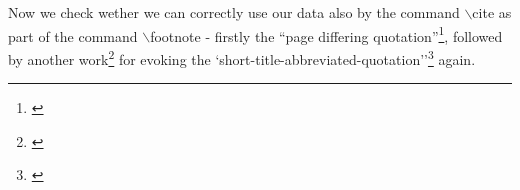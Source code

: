 \documentclass[DIV=calc,BCOR=5mm,11pt,headings=small,oneside,abstract=true, toc=bib]{scrartcl}
\begin{document}
Now we check wether we can correctly use our data also by the command
$\backslash$cite as part of the command $\backslash$footnote - firstly the
``page differing quotation''\footnote{\cite[cf.][S.125]{Maass2008a}}, followed by
another work\footnote{\cite[cf.][S.42]{Spielkamp2008a}} for evoking the
`short-title-abbreviated-quotation''\footnote{\cite[cf.][S.125]{Maass2008a}}
again.


\small


\footnotesize


\printnomenclature
\end{document}
